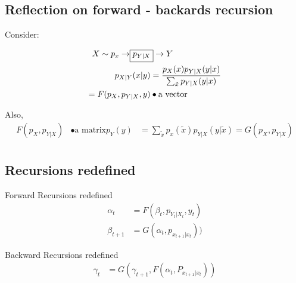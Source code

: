 \documentclass{article}
\begin{document}
\subsection{Reflection on forward - backards recursion}

Consider:

\begin{align*}
X \sim p_x \rightarrow \Aboxed{p_{Y|X}} \rightarrow Y\\
p_{X|Y}(x|y) &= \frac{p_X(x) p_{Y|X}(y|x)}{\sum_{\tilde{x}}^{} p_{Y|X}(y|x)}\\
= F(p_X, p_{Y|X}, y) &\bullet \text{a vector}
\end{align*}

Also, 
\begin{align*}
F(p_{X}, p_{Y|X}) &\bullet \text{a matrix}
p_Y(y) &= \sum_{\tilde{x}}^{} p_x(\tilde{x})p_{Y|X}(y|\tilde{x}) = G(p_X, p_{Y|X})\\
\end{align*}

\subsection{Recursions redefined}

Forward Recursions redefined
\begin{align}
\alpha_t&= F(\beta_t, p_{Y_t|X_t}, y_t)\\
\beta_{t+1} &= G(\alpha_t, p_{x_{t+1} | x_t}))
\end{align}

Backward Recursions redefined
\begin{align}
\gamma_t &= G(\gamma_{t+1}, F(\alpha_t, P_{x_{t+1} | x_t}))
\end{align}
\end{document}
